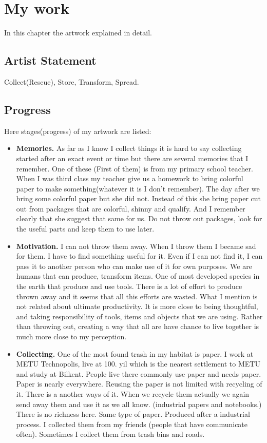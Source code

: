 \chapter{My work}
In this chapter the artwork explained in detail. 

\section{Artist Statement}
Collect(Rescue), Store, Transform, Spread.

\section{Progress}
Here stages(progress) of my artwork are listed:
\begin{itemize}
\item \textbf{Memories.} As far as I know I collect things it is hard to say collecting started after an exact event or time but there are several memories that I remember. One of these (First of them) is from my primary school teacher. When I was third class my teacher give us a homework to bring colorful paper to make something(whatever it is I don't remember). The day after we bring some colorful paper but she did not. Instead of this she bring paper cut out from packages that are colorful, shinny and qualify. And I remember clearly that she suggest that same for us. Do not throw out packages, look for the useful parts and keep them to use later. 
\item \textbf{Motivation.} I can not throw them away. When I throw them I became sad for them. I have to find something useful for it. Even if I can not find it, I can pass it to another person who can make use of it for own purposes. We are humans that can produce, transform items. One of most developed species in the earth that produce and use tools. There is a lot of effort to produce thrown away and it seems that all this efforts are wasted. What I mention is not related about ultimate productivity. It is more close to being thoughtful, and taking responsibility of tools, items and objects that we are using. Rather than throwing out, creating a way that all are have chance to live together is much more close to my perception. 
\item \textbf{Collecting.} One of the most found trash in my habitat is paper. I work at METU Technopolis, live at 100. yil which is the nearest settlement to METU and study at Bilkent. People live there commonly use paper and needs paper. Paper is nearly everywhere. Reusing the paper is not limited with recycling of it. There is a another ways of it. When we recycle them actually we again send away them and use it as we all know. (industrial papers and notebooks.) There is no richness here. Same type of paper. Produced after a industrial process. I collected them from my friends (people that have communicate often). Sometimes I collect them from trash bins and roads. 

\end{itemize}
